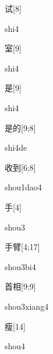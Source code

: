 \begin{verbete}[shi4]{试}[8]
\begin{pronuncia}{shi4}
\end{pronuncia}
\end{verbete}

\begin{verbete}[shi4]{室}[9]
\begin{pronuncia}{shi4}
\end{pronuncia}
\end{verbete}

\begin{verbete}[shi4]{是}[9]
\begin{pronuncia}{shi4}
\end{pronuncia}
\end{verbete}

\begin{verbete}[shi4de]{是的}[9;8]
\begin{pronuncia}{shi4de}
\end{pronuncia}
\end{verbete}

\begin{verbete}{收到}[6;8]
\begin{pronuncia}{shou1dao4}
\end{pronuncia}
\end{verbete}

\begin{verbete}[shou3]{手}[4]
\begin{pronuncia}{shou3}
\end{pronuncia}
\end{verbete}

\begin{verbete}[shou3bi4]{手臂}[4;17]
\begin{pronuncia}{shou3bi4}
\end{pronuncia}
\end{verbete}

\begin{verbete}{首相}[9;9]
\begin{pronuncia}{shou3xiang4}
\end{pronuncia}
\end{verbete}

\begin{verbete}[shou4]{瘦}[14]
\begin{pronuncia}{shou4}
\end{pronuncia}
\end{verbete}


